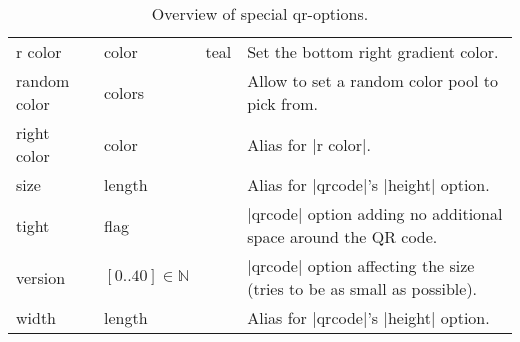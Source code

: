 \documentclass[parskip=half,english,numbers=noenddot,footnotes=nomultiple,oneside]{scrartcl}
\begin{document}
\begin{savenotes}
\begin{table}
\begin{tabular}{>{\ttfamily}ll>{\ttfamily}cp{.5\linewidth}}
		r color         & color   &  teal    & Set the bottom right gradient color.                         \\
		random color    & colors  &          & Allow to set a random color pool to pick from.               \\
		right color     & color   &          & Alias for |r color|.                                         \\
		size            & length  &          & Alias for |qrcode|'s |height| option.                        \\
		tight           & flag    &          & |qrcode| option adding no additional space around the QR code.                                                    \\
		version         & \([0..40] \in \mathbb{N}\) &   0      & |qrcode| option affecting the size (tries to be as small as possible).                                             \\
		width           & length  &          & Alias for |qrcode|'s |height| option.                        \\
		\bottomrule
	\end{tabular}
	\caption{Overview of special qr-options.}
	\label{tbl:extra-keys}
\end{table}
\end{savenotes}
\end{document}
